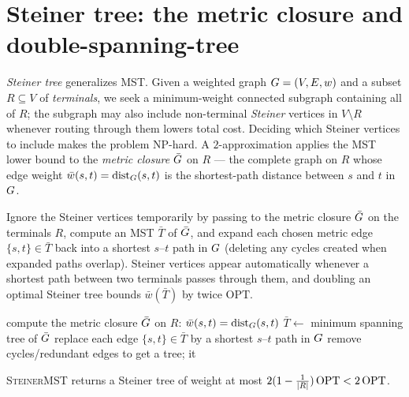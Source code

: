 \section{Steiner tree: the metric closure and double-spanning-tree}

\emph{Steiner tree} generalizes MST. Given a weighted graph $G=(V,E,w)$ and a subset $R\subseteq V$ of
\emph{terminals}, we seek a minimum-weight connected subgraph containing all of $R$; the subgraph may also
include non-terminal \emph{Steiner} vertices in $V\setminus R$ whenever routing through them lowers total
cost. Deciding which Steiner vertices to include makes the problem \textsf{NP}-hard. A $2$-approximation
applies the MST lower bound to the \emph{metric closure} $\bar{G}$ on $R$ --- the complete graph on $R$
whose edge weight $\bar w(s,t)=\operatorname{dist}_G(s,t)$ is the shortest-path distance between $s$ and $t$ in $G$.

\begin{intuitionbox}
Ignore the Steiner vertices temporarily by passing to the metric closure $\bar{G}$ on the terminals $R$,
compute an MST $\bar T$ of $\bar{G}$, and expand each chosen metric edge $\{s,t\}\in\bar T$ back into a
shortest $s$--$t$ path in $G$ (deleting any cycles created when expanded paths overlap). Steiner
vertices appear automatically whenever a shortest path between two terminals passes through them, and
doubling an optimal Steiner tree bounds $\bar w(\bar T)$ by twice $\mathrm{OPT}$.
\end{intuitionbox}

\begin{algorithm}[H]
\caption{\textsc{SteinerMST}$(\Gph,w,R)$}\label{ch38:alg-steiner}
\DontPrintSemicolon
compute the metric closure $\bar{G}$ on $R$: $\bar w(s,t)=\operatorname{dist}_G(s,t)$\;
$\bar T \gets$ minimum spanning tree of $\bar{G}$\;
replace each edge $\{s,t\}\in\bar T$ by a shortest $s$--$t$ path in $G$\;
remove cycles/redundant edges to get a tree; \Return it\;
\end{algorithm}

\begin{theorem}\label{ch38:thm-steiner2}
\textup{\textsc{SteinerMST}} returns a Steiner tree of weight at most $2(1-\tfrac1{\lvert R\rvert})\,\mathrm{OPT}<2\,\mathrm{OPT}$.
\end{theorem}

